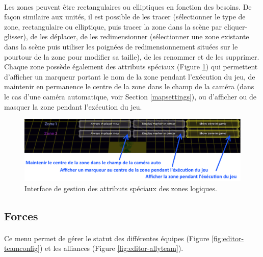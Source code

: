 \documentclass[a4paper]{article}
\begin{document}
\paragraph{ }
Les zones peuvent être rectangulaires ou elliptiques en fonction des besoins. De façon similaire aux unités, il est possible de les tracer (sélectionner le type de zone, rectangulaire ou elliptique, puis tracer la zone dans la scène par cliquer-glisser), de les déplacer, de les redimensionner (sélectionner une zone existante dans la scène puis utiliser les poignées de redimensionnement situées sur le pourtour de la zone pour modifier sa taille), de les renommer et de les supprimer. Chaque zone possède également des attributs spéciaux (Figure \ref{fig:editor-zones-special}) qui permettent d'afficher un marqueur portant le nom de la zone pendant l'exécution du jeu, de maintenir en permanence le centre de la zone dans le champ de la caméra (dans le cas d'une caméra automatique, voir Section \ref{mapsettings}), ou d'afficher ou de masquer la zone pendant l'exécution du jeu.
\begin{figure}[H]
\centering
\includegraphics[width=\linewidth]{editor-zones-special.png}
\caption{Interface de gestion des attributs spéciaux des zones logiques.}
\label{fig:editor-zones-special}
\end{figure}
\subsection{Forces}
\paragraph{ }
Ce menu permet de gérer le statut des différentes équipes (Figure \ref{fig:editor-teamconfig}) et les alliances (Figure \ref{fig:editor-allyteam}).
\end{document}
